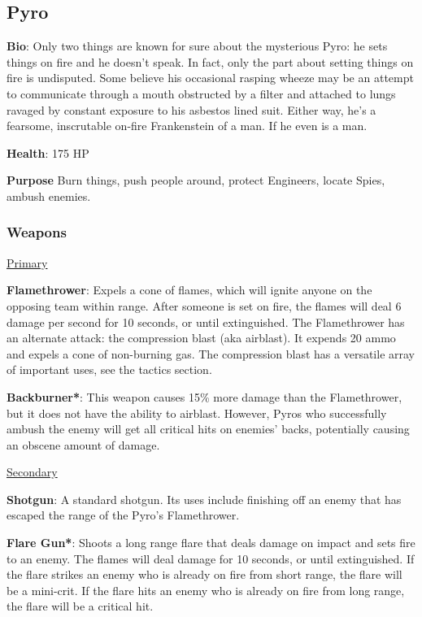\subsection{Pyro}
{\bf Bio}:
Only two things are known for sure about the mysterious Pyro: he sets things on fire and he doesn't speak. In fact, only the part about setting things on fire is undisputed. Some believe his occasional rasping wheeze may be an attempt to communicate through a mouth obstructed by a filter and attached to lungs ravaged by constant exposure to his asbestos lined suit. Either way, he's a fearsome, inscrutable on-fire Frankenstein of a man. If he even is a man.

{\bf Health}: 175 HP

{\bf Purpose}
Burn things, push people around, protect Engineers, locate Spies, ambush enemies.

\subsubsection {Weapons}

\begin {center}
\underline {Primary}
\end {center}

{\bf Flamethrower}: Expels a cone of flames, which will ignite anyone on the opposing team within range. After someone is set on fire, the flames will deal 6 damage per second for 10 seconds, or until extinguished. The Flamethrower has an alternate attack: the compression blast (aka airblast). It expends 20 ammo and expels a cone of non-burning gas. The compression blast has a versatile array of important uses, see the tactics section.

{\bf Backburner*}: This weapon causes 15\% more damage than the Flamethrower, but it does not have the ability to airblast. However, Pyros who successfully ambush the enemy will get all critical hits on enemies' backs, potentially causing an obscene amount of damage. 


\begin {center}
\underline {Secondary}
\end {center}

{\bf Shotgun}: A standard shotgun. Its uses include finishing off an enemy that has escaped the range of the Pyro's Flamethrower.

{\bf Flare Gun*}: Shoots a long range flare that deals damage on impact and sets fire to an enemy. The flames will deal damage for 10 seconds, or until extinguished. If the flare strikes an enemy who is already on fire from short range, the flare will be a mini-crit. If the flare hits an enemy who is already on fire from long range, the flare will be a critical hit.

